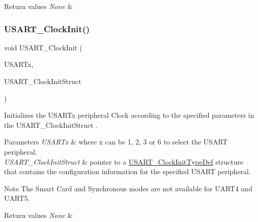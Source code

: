 \begin{DoxyRetVals}{Return values}
{\em None} & \\
\hline
\end{DoxyRetVals}
\mbox{\label{group___u_s_a_r_t_gadb50c7a2175c91acd3728f8eefd0c63d}} 
\subsubsection{\texorpdfstring{U\+S\+A\+R\+T\+\_\+\+Clock\+Init()}{USART\_ClockInit()}}
{\footnotesize\ttfamily void U\+S\+A\+R\+T\+\_\+\+Clock\+Init (\begin{DoxyParamCaption}\item[{U\+S\+A\+R\+T\+\_\+\+Type\+Def $\ast$}]{U\+S\+A\+R\+Tx,  }\item[{\mbox{\hyperlink{struct_u_s_a_r_t___clock_init_type_def}{U\+S\+A\+R\+T\+\_\+\+Clock\+Init\+Type\+Def}} $\ast$}]{U\+S\+A\+R\+T\+\_\+\+Clock\+Init\+Struct }\end{DoxyParamCaption})}



Initializes the U\+S\+A\+R\+Tx peripheral Clock according to the specified parameters in the U\+S\+A\+R\+T\+\_\+\+Clock\+Init\+Struct . 


\begin{DoxyParams}{Parameters}
{\em U\+S\+A\+R\+Tx} & where x can be 1, 2, 3 or 6 to select the U\+S\+A\+RT peripheral. \\
\hline
{\em U\+S\+A\+R\+T\+\_\+\+Clock\+Init\+Struct} & pointer to a \mbox{\hyperlink{struct_u_s_a_r_t___clock_init_type_def}{U\+S\+A\+R\+T\+\_\+\+Clock\+Init\+Type\+Def}} structure that contains the configuration information for the specified U\+S\+A\+RT peripheral. \\
\hline
\end{DoxyParams}
\begin{DoxyNote}{Note}
The Smart Card and Synchronous modes are not available for U\+A\+R\+T4 and U\+A\+R\+T5. ~\newline

\end{DoxyNote}

\begin{DoxyRetVals}{Return values}
{\em None} & \\
\hline
\end{DoxyRetVals}
\mbox{\label{group___u_s_a_r_t_ga59df27d0adda18b16ee28d47672cc724}} 
